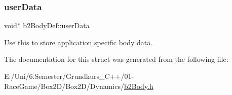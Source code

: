 \subsubsection{\texorpdfstring{userData}{userData}}
{\footnotesize\ttfamily void$\ast$ b2\+Body\+Def\+::user\+Data}



Use this to store application specific body data. 



The documentation for this struct was generated from the following file\+:\begin{DoxyCompactItemize}
\item 
E\+:/\+Uni/6.\+Semester/\+Grundkurs\+\_\+\+C++/01-\/\+Race\+Game/\+Box2\+D/\+Box2\+D/\+Dynamics/\mbox{\hyperlink{b2_body_8h}{b2\+Body.\+h}}\end{DoxyCompactItemize}
